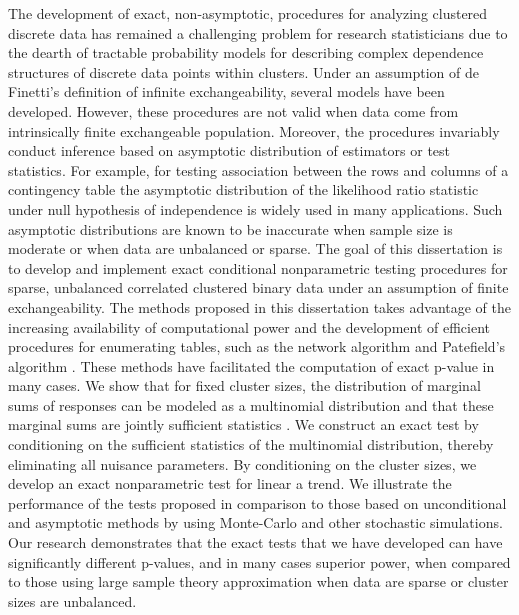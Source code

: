 \documentclass[12pt,oneside]{report}
\theoremstyle{definition}
\theoremstyle{mystyle}
\begin{document}
 
The development of exact, non-asymptotic, procedures for analyzing clustered discrete data has remained a challenging problem for research statisticians due to the dearth of tractable probability models for describing complex dependence structures of discrete data points within clusters.  Under an assumption of de Finetti's \cite{Diaconis1} definition of infinite exchangeability, several models have been developed.  However, these procedures are not valid when data come from intrinsically finite exchangeable population. Moreover, the procedures invariably conduct inference based on asymptotic distribution of estimators or test statistics.   For example, for testing association between the rows and columns of a contingency table   the asymptotic distribution of the likelihood ratio statistic under null hypothesis of independence is widely used in many applications. Such asymptotic distributions are known to be inaccurate when sample size is moderate or when data are unbalanced or sparse\cite{mehta1992}. The goal of this dissertation is to develop and implement exact conditional nonparametric testing procedures for sparse, unbalanced correlated clustered binary data under an assumption of finite exchangeability.  The methods proposed in this dissertation takes advantage of the increasing availability of computational power and the development of efficient procedures for enumerating tables, such as the network algorithm \cite{Mehta1983} and Patefield's algorithm \cite{patefield}. These methods have facilitated the computation of exact p-value in many cases.  We show that for fixed cluster sizes, the distribution of marginal sums of responses can be modeled as a multinomial distribution and that these marginal sums are jointly sufficient statistics  \cite{bg}. We construct an exact test by conditioning on the sufficient statistics of the multinomial distribution, thereby eliminating all nuisance parameters. By conditioning on the cluster sizes, we develop an exact nonparametric test for linear a trend.  We illustrate the performance of the tests proposed in comparison to those based on unconditional and asymptotic methods by using Monte-Carlo and other stochastic simulations. Our research demonstrates that   the exact tests that we have developed can have significantly different p-values, and in  many cases superior power, when compared to those using large sample theory approximation when data are  sparse or cluster sizes are unbalanced.
\pagebreak

\newpage
\end{document}
